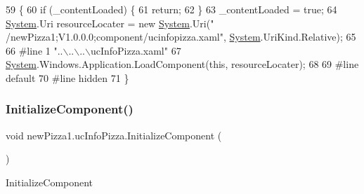 \begin{DoxyCode}
59                                           \{
60             \textcolor{keywordflow}{if} (\_contentLoaded) \{
61                 \textcolor{keywordflow}{return};
62             \}
63             \_contentLoaded = \textcolor{keyword}{true};
64             \hyperlink{namespaceSystem}{System}.Uri resourceLocater = \textcolor{keyword}{new} \hyperlink{namespaceSystem}{System}.Uri(\textcolor{stringliteral}{"
      /newPizza1;V1.0.0.0;component/ucinfopizza.xaml"}, \hyperlink{namespaceSystem}{System}.UriKind.Relative);
65             
66 \textcolor{preprocessor}{            #line 1 "..\(\backslash\)..\(\backslash\)..\(\backslash\)ucInfoPizza.xaml"}
67             \hyperlink{namespaceSystem}{System}.Windows.Application.LoadComponent(\textcolor{keyword}{this}, resourceLocater);
68             
69 \textcolor{preprocessor}{            #line default}
70 \textcolor{preprocessor}{            #line hidden}
71         \}
\end{DoxyCode}
\mbox{\label{classnewPizza1_1_1ucInfoPizza_a5d6e37c02a381d24941d4f45b4a21dbe}} 
\subsubsection{\texorpdfstring{Initialize\+Component()}{InitializeComponent()}\hspace{0.1cm}{\footnotesize\ttfamily [2/6]}}
{\footnotesize\ttfamily void new\+Pizza1.\+uc\+Info\+Pizza.\+Initialize\+Component (\begin{DoxyParamCaption}{ }\end{DoxyParamCaption})\hspace{0.3cm}{\ttfamily [inline]}}



Initialize\+Component 


